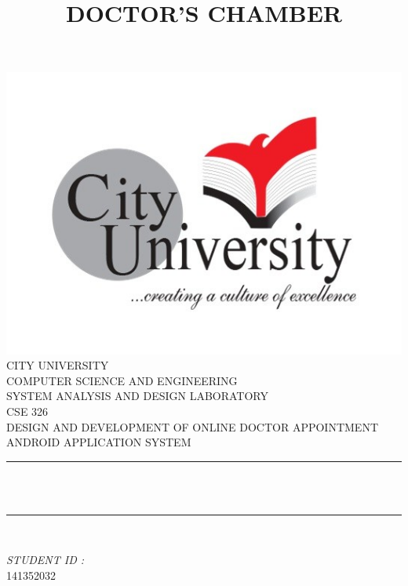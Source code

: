 \documentclass[12pt]{article}
\title{DOCTOR'S CHAMBER}								%
\makeatletter
\let\thetitle\@title
\let\thedate\@date
\makeatother
\begin{document}

\begin{titlepage}
	\centering
    \vspace*{0.5 cm}
    \includegraphics[scale = 0.35]{City-Logo.jpg}\\[1.0 cm]	%
    \textsc{\LARGE CITY UNIVERSITY}\\[2.0 cm]
    \textsc{\lARGE COMPUTER SCIENCE AND ENGINEERING}\\[0.2 cm]
    \textsc{\lARGE SYSTEM ANALYSIS AND DESIGN LABORATORY}\\[0.2 cm]
	\textsc{\Large CSE 326}\\[0.5 cm]				%
	\textsc{\large DESIGN AND DEVELOPMENT OF ONLINE DOCTOR APPOINTMENT ANDROID APPLICATION SYSTEM}\\[0.2 cm]
	\rule{\linewidth}{0.2 mm} \\[0.4 cm]
	{ \huge \bfseries \thetitle}\\
	\rule{\linewidth}{0.2 mm} \\[1.5 cm]
	
	\begin{minipage}{0.4\textwidth}
		
			\begin{flushright} \large
			\emph{STUDENT ID :} \\
			141352032\linebreak
		\end{flushright}
	\end{minipage}\\[2 cm]
	
	{\large \thedate}\\[2 cm]
 
	\vfill
	
\end{titlepage}
\end{document}
